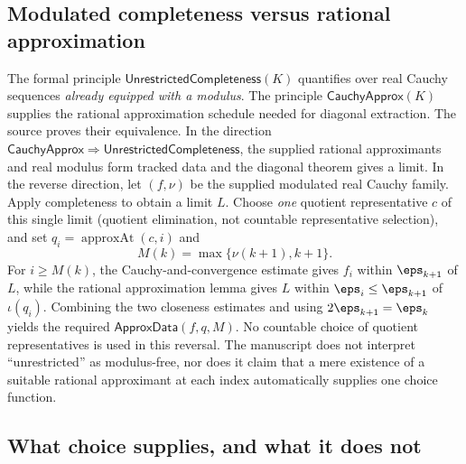 \subsection{Modulated completeness versus rational approximation}\label{supp:13-4}
\par{}\par\smallskip

The formal principle $\mathsf{UnrestrictedCompleteness}(K)$ quantifies over real Cauchy sequences \emph{already equipped with a modulus}. The principle $\mathsf{CauchyApprox}(K)$ supplies the rational approximation schedule needed for diagonal extraction. The source proves their equivalence. In the direction $\mathsf{CauchyApprox}\Rightarrow\mathsf{UnrestrictedCompleteness}$, the supplied rational approximants and real modulus form tracked data and the diagonal theorem gives a limit. In the reverse direction, let $(f,\nu)$ be the supplied modulated real Cauchy family. Apply completeness to obtain a limit $L$. Choose \emph{one} quotient representative $c$ of this single limit (quotient elimination, not countable representative selection), and set $q_i=\operatorname{approxAt}(c,i)$ and
\[
M(k)=\max\{\nu(k+1),k+1\}.
\]
For $i\ge M(k)$, the Cauchy-and-convergence estimate gives $f_i$ within $\eps_{k+1}$ of $L$, while the rational approximation lemma gives $L$ within $\eps_i\le\eps_{k+1}$ of $\iota(q_i)$. Combining the two closeness estimates and using $2\eps_{k+1}=\eps_k$ yields the required $\mathsf{ApproxData}(f,q,M)$. No countable choice of quotient representatives is used in this reversal. The manuscript does not interpret ``unrestricted'' as modulus-free, nor does it claim that a mere existence of a suitable rational approximant at each index automatically supplies one choice function.

\subsection{What choice supplies, and what it does not}\label{supp:13-5}
\par{}\par\smallskip

